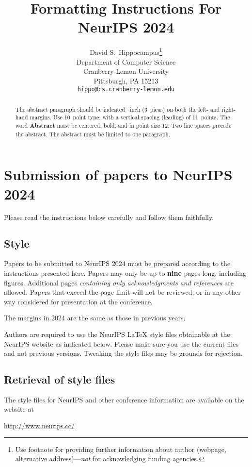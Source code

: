 \documentclass{article}
\title{Formatting Instructions For NeurIPS 2024}
\author{%
  David S.~Hippocampus\thanks{Use footnote for providing further information
    about author (webpage, alternative address)---\emph{not} for acknowledging
    funding agencies.} \\
  Department of Computer Science\\
  Cranberry-Lemon University\\
  Pittsburgh, PA 15213 \\
  \texttt{hippo@cs.cranberry-lemon.edu} \\
}
\begin{document}
\maketitle

\begin{abstract}
    The abstract paragraph should be indented ~inch (3~picas) on both the left- and right-hand margins. Use 10~point type, with a vertical spacing (leading) of 11~points. The word \textbf{Abstract} must be centered, bold, and in point size 12. Two line spaces precede the abstract. The abstract must be limited to one paragraph.
\end{abstract}

\section{Submission of papers to NeurIPS 2024}

Please read the instructions below carefully and follow them faithfully.

\subsection{Style}

Papers to be submitted to NeurIPS 2024 must be prepared according to the instructions presented here. Papers may only be up to {\bf nine} pages long, including figures. Additional pages \emph{containing only acknowledgments and references} are allowed. Papers that exceed the page limit will not be reviewed, or in any other way considered for presentation at the conference.

The margins in 2024 are the same as those in previous years.

Authors are required to use the NeurIPS \LaTeX{} style files obtainable at the NeurIPS website as indicated below. Please make sure you use the current files and not previous versions. Tweaking the style files may be grounds for rejection.

\subsection{Retrieval of style files}

The style files for NeurIPS and other conference information are available on the website at

\begin{center}
    \url{http://www.neurips.cc/}
\end{center}
\end{document}
